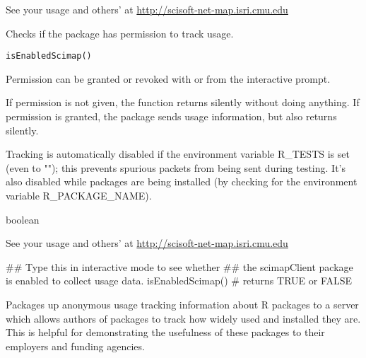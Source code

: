 \documentclass[letterpaper]{book}
\begin{document}
%
\begin{References}\relax
See your usage and others' at \url{http://scisoft-net-map.isri.cmu.edu}
\end{References}
%
\begin{Description}\relax
Checks if the package has permission to track usage.
\end{Description}
%
\begin{Usage}
\begin{verbatim}
isEnabledScimap()
\end{verbatim}
\end{Usage}
%
\begin{Details}\relax
Permission can be granted or revoked with 
or  from the interactive prompt.

If permission is not given, the  function
returns silently without doing anything.  If permission is
granted, the package sends usage information, but also
returns silently.

Tracking is automatically disabled if the environment variable R\_TESTS is
set (even to ""); this prevents spurious packets from being sent during testing.
It's also disabled while packages are being installed (by checking for the
environment variable R\_PACKAGE\_NAME).
\end{Details}
%
\begin{Value}
boolean
\end{Value}
%
\begin{References}\relax
See your usage and others' at \url{http://scisoft-net-map.isri.cmu.edu}
\end{References}
%
\begin{SeeAlso}\relax
{}
\end{SeeAlso}
%
\begin{Examples}
\begin{ExampleCode}
## Type this in interactive mode to see whether
## the scimapClient package is enabled to collect usage data.
isEnabledScimap()
# returns TRUE or FALSE
\end{ExampleCode}
\end{Examples}
%
\begin{Description}\relax
Packages up anonymous usage tracking information about R packages
to a server which allows authors of packages to track how
widely used and installed they are.  This is helpful
for demonstrating the usefulness of these packages to
their employers and funding agencies.
\end{Description}
\end{document}
